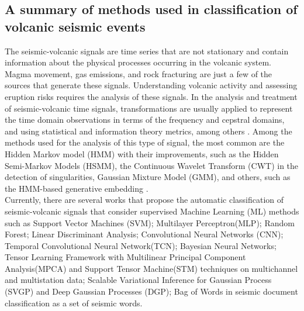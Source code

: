 \documentclass[lettersize,journal]{IEEEtran}
\begin{document}
\subsection{A summary of methods used in classification of volcanic seismic events}
\noindent The seismic-volcanic signals are time series that are not stationary and contain information about the physical processes occurring in the volcanic system. Magma movement, gas emissions, and rock fracturing are just a few of the sources that generate these signals. Understanding volcanic activity and assessing eruption risks requires the analysis of these signals.
In the analysis and treatment of seismic-volcanic time signals, transformations are usually applied to represent the time domain observations in terms of the frequency and cepstral domains, and using statistical and information theory metrics, among others \cite{malfante2018automatic,lara2020automatic}. Among the methods used for the analysis of this type of signal, the most common are the Hidden Markov model (HMM)\cite{bicego2012classification,beyreuther2012constructing, carniel2014characterization} with their improvements, such as the Hidden Semi-Markov Models (HSMM), the Continuous Wavelet Transform (CWT)\cite{beyreuther2012constructing} in the detection of singularities, Gaussian Mixture Model (GMM)\cite{langer2009synopsis}, and others, such as the HMM-based generative embedding \cite{bicego2012classification}. \\
Currently, there are several works that propose the automatic classification of seismic-volcanic signals that consider supervised Machine Learning (ML) methods such as Support Vector Machines (SVM)\cite{malfante2018automatic,curilem2016pattern,giacco2009support,langer2009synopsis,lara2020automatic,curilem2018improving,malfante2018machine}; Multilayer Perceptron(MLP)\cite{giacco2009support,langer2009synopsis,lara2020automatic}; Random Forest\cite{malfante2018automatic,lara2020automatic,titos2019classification}; Linear Discriminant Analysis\cite{lara2020automatic}; Convolutional Neural Networks (CNN)\cite{titos2019classification,salazar2020deep,curilem2018using}; Temporal Convolutional Neural Network(TCN)\cite{titos2019classification,rodriguez2021bayesian}; Bayesian Neural Networks\cite{bueno2019volcano}; Tensor Learning Framework with Multilinear Principal Component Analysis(MPCA) and Support Tensor Machine(STM)\cite{peixoto2021tensor} techniques on multichannel and multistation data; Scalable Variational Inference for Gaussian Process (SVGP) and Deep Gaussian Processes (DGP)\cite{lopez2020acontribution}; Bag of Words in seismic document classification as a set of seismic words\cite{bicego2015volcano}. \\
\end{document}
